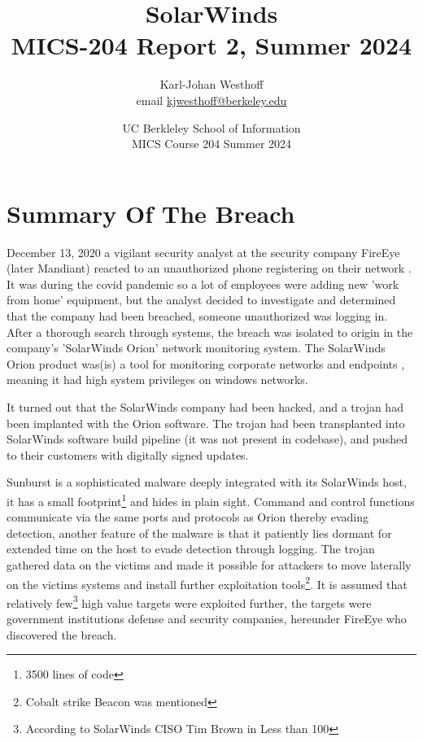 \documentclass[
	letterpaper, %
	10pt, %
	unnumberedsections, %
	twoside, %
]{LTJournalArticle}
\title{SolarWinds \\ MICS-204 Report 2, Summer 2024} %
\author{
	Karl-Johan Westhoff \\
	email \href{mailto:kjwesthoff@berkeley.edu}{kjwesthoff@berkeley.edu}
}
\date{UC Berkleley School of Information \\
MICS Course 204 Summer 2024
}
\begin{document}
\maketitle %


\section{Summary Of The Breach}
December 13, 2020 a vigilant security analyst at the security company FireEye (later Mandiant) reacted to an unauthorized phone registering on their network \cite{CNN_FireEye}. It was during the covid pandemic so a lot of employees were adding new 'work from home' equipment, but the analyst decided to investigate and determined that the company had been breached, someone unauthorized was logging in. After a thorough search through systems, the breach was isolated to origin in the company's 'SolarWinds Orion' network monitoring system. The SolarWinds Orion product was(is) a tool for monitoring corporate networks and endpoints \cite{SolarWindsOrion}, meaning it had high system privileges on windows networks. \par
It turned out that the SolarWinds company had been hacked, and a trojan had been implanted with the Orion software. The trojan had been transplanted into SolarWinds software build pipeline (it was not present in codebase), and pushed to their customers with digitally signed updates. \par
Sunburst is a sophisticated malware deeply integrated with its SolarWinds host, it has a small footprint\footnote{3500 lines of code} and hides in plain sight. Command and control functions communicate via the same ports and protocols as Orion thereby evading detection, another feature of the malware is that it patiently lies dormant for extended time on the host to evade detection through logging. The trojan gathered data on the victims and made it possible for attackers to move laterally on the victims systems and install further exploitation tools\footnote{Cobalt strike Beacon was mentioned\cite{Mandiant}}. It is assumed that relatively few\footnote{According to SolarWinds CISO Tim Brown in \cite{SolarWindsCISO} Less than 100} high value targets were exploited further, the targets were government institutions defense and security companies, hereunder FireEye who discovered the breach.
\end{document}
